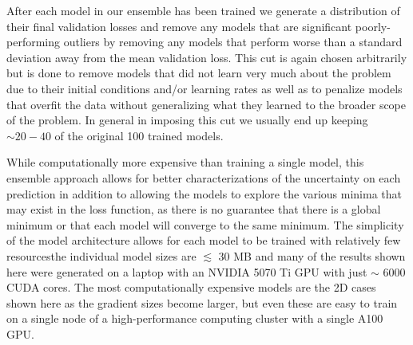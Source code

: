 \documentclass[floatfix,twocolumn,trackchanges,linenumbers]{aastex7}
\begin{document}
After each model in our ensemble has been trained we generate a distribution of their final validation losses and remove any models that are significant poorly-performing outliers by removing any models that perform worse than a standard deviation away from the mean validation loss. This cut is again chosen arbitrarily but is done to remove models that did not learn very much about the problem due to their initial conditions and/or learning rates as well as to penalize models that overfit the data without generalizing what they learned to the broader scope of the problem. In general in imposing this cut we usually end up keeping $\sim 20-40$ of the original 100 trained models.

While computationally more expensive than training a single model, this ensemble approach allows for better characterizations of the uncertainty on each prediction in addition to allowing the models to explore the various minima that may exist in the loss function, as there is no guarantee that there is a global minimum or that each model will converge to the same minimum. The simplicity of the model architecture allows for each model to be trained with relatively few resources\textemdash the individual model sizes are $\lesssim$ 30 MB and many of the results shown here were generated on a laptop with an NVIDIA 5070 Ti GPU with just $\sim$ 6000 CUDA cores. The most computationally expensive models are the 2D cases shown here as the gradient sizes become larger, but even these are easy to train on a single node of a high-performance computing cluster with a single A100 GPU.  
\end{document}
